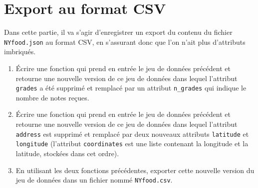 \documentclass[11pt,a4paper]{article}
\begin{document}
\section{Export au format CSV}

Dans cette partie, il va s'agir d'enregistrer un export du contenu du fichier \verb+NYfood.json+ au format CSV, en s'assurant donc que l'on n'ait plus d'attributs imbriqués.

\begin{enumerate}
    \item Écrire une fonction qui prend en entrée le jeu de données précédent et retourne une nouvelle version de ce jeu de données dans lequel l'attribut \verb+grades+ a été supprimé et remplacé par un attribut \verb+n_grades+ qui indique le nombre de notes reçues.
    
    \item Écrire une fonction qui prend en entrée le jeu de données précédent et retourne une nouvelle version de ce jeu de données dans lequel l'attribut \verb+address+ est supprimé et remplacé par deux nouveaux attributs \verb+latitude+ et \verb+longitude+ (l'attribut \verb+coordinates+ est une liste contenant la longitude et la latitude, stockées dans cet ordre).
    
    \item En utilisant les deux fonctions précédentes, exporter cette nouvelle version du jeu de données dans un fichier nommé \verb+NYfood.csv+.
\end{enumerate}
\end{document}
